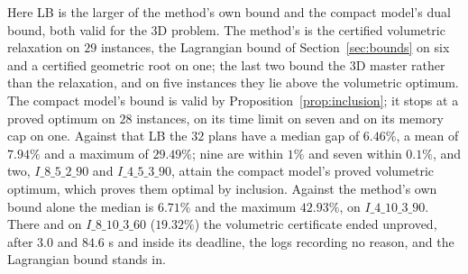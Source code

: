 Here LB is the larger of the method's own bound and the compact model's
dual bound, both valid for the 3D problem. The method's is the
certified volumetric relaxation on $29$ instances, the Lagrangian bound
of Section~\ref{sec:bounds} on six and a certified geometric root on
one; the last two bound the 3D master rather than the relaxation, and
on five instances they lie above the volumetric optimum. The compact
model's bound is valid by Proposition~\ref{prop:inclusion}; it stops
at a proved optimum on $28$ instances, on its time limit on seven and
on its memory cap on one.
Against that LB the $32$ plans have a median gap of $6.46\%$, a mean of
$7.94\%$ and a maximum of $29.49\%$; nine are within $1\%$ and seven
within $0.1\%$, and two, $I\_8\_5\_2\_90$ and $I\_4\_5\_3\_90$, attain
the compact model's proved volumetric optimum, which proves them
optimal by inclusion. Against the method's own bound alone the median
is $6.71\%$ and the maximum $42.93\%$, on $I\_4\_10\_3\_90$. There and
on $I\_8\_10\_3\_60$ ($19.32\%$) the volumetric certificate ended
unproved, after $3.0$ and $84.6$ s and inside its deadline, the logs
recording no reason, and the Lagrangian bound stands in.

